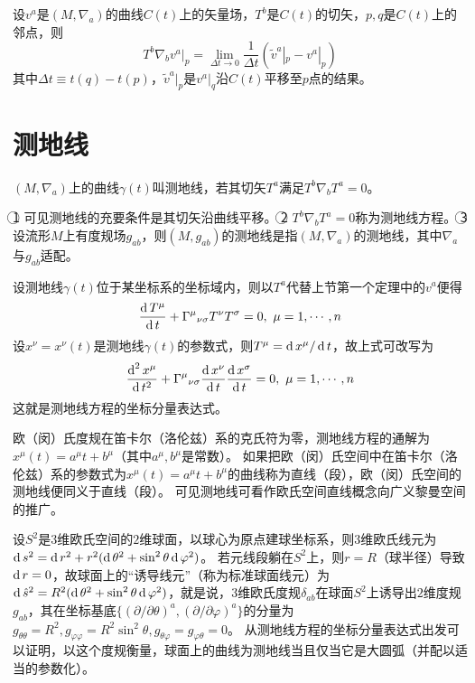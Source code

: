 \begin{theorem}
设$v^a$是$(M, \nabla_a)$的曲线$C(t)$上的矢量场，$T^b$是$C(t)$的切矢，$p, q$是$C(t)$上的邻点，则
$$T^b\nabla_bv^a|_p = \lim_{\Delta t \to 0}\frac{1}{\Delta t}(\tilde v^a|_p - v^a|_p)$$
其中$\Delta t \equiv t(q) - t(p)$，$\tilde v^a|_p$是$v^a|_q$沿$C(t)$平移至$p$点的结果。
\end{theorem}

\section{测地线}

\begin{definition}
$(M, \nabla_a)$上的曲线$\gamma(t)$叫测地线，若其切矢$T^a$满足$T^b\nabla_bT^a = 0$。
\end{definition}

\begin{note}
\textcircled{1} 可见测地线的充要条件是其切矢沿曲线平移。
\textcircled{2} $T^b\nabla_bT^a = 0$称为测地线方程。
\textcircled{3} 设流形$M$上有度规场$g_{ab}$，则$(M, g_{ab})$的测地线是指$(M, \nabla_a)$的测地线，其中$\nabla_a$与$g_{ab}$适配。
\end{note}

设测地线$\gamma(t)$位于某坐标系的坐标域内，则以$T^a$代替上节第一个定理中的$v^a$便得
$$\frac{\operatorname{d} T^\mu}{\operatorname{d} t} + \Gamma^\mu{}_{\nu\sigma}T^\nu T^\sigma = 0, ~ \mu = 1, \cdots, n$$
设$x^\nu = x^\nu(t)$是测地线$\gamma(t)$的参数式，则$T^\mu = \operatorname{d} x^\mu / \operatorname{d} t$，故上式可改写为
$$\frac{\operatorname{d}^2x^\mu}{\operatorname{d} t^2} + \Gamma^\mu{}_{\nu\sigma}\frac{\operatorname{d} x^\nu}{\operatorname{d} t}\frac{\operatorname{d} x^\sigma}{\operatorname{d} t} = 0, ~ \mu = 1, \cdots, n$$
这就是测地线方程的坐标分量表达式。

\begin{example}
欧（闵）氏度规在笛卡尔（洛伦兹）系的克氏符为零，测地线方程的通解为$x^\mu(t) = a^\mu t + b^\mu$（其中$a^\mu, b^\mu$是常数）。
如果把欧（闵）氏空间中在笛卡尔（洛伦兹）系的参数式为$x^\mu(t) = a^\mu t + b^\mu$的曲线称为直线（段），欧（闵）氏空间的测地线便同义于直线（段）。
可见测地线可看作欧氏空间直线概念向广义黎曼空间的推广。
\end{example}

\begin{example}
设$S^2$是$3$维欧氏空间的$2$维球面，以球心为原点建球坐标系，则$3$维欧氏线元为$\operatorname{d} s^2 = \operatorname{d} r^2 + r^2(\operatorname{d} \theta^2 + \sin^2\theta\operatorname{d}\varphi^2)$。
若元线段躺在$S^2$上，则$r = R$（球半径）导致$\operatorname{d} r = 0$，故球面上的``诱导线元''（称为标准球面线元）为$\operatorname{d}\hat{s}^2 = R^2(\operatorname{d} \theta^2 + \sin^2\theta\operatorname{d}\varphi^2)$，就是说，$3$维欧氏度规$\delta_{ab}$在球面$S^2$上诱导出$2$维度规$g_{ab}$，其在坐标基底$\{(\partial / \partial\theta)^a, (\partial / \partial\varphi)^a\}$的分量为$g_{\theta\theta} = R^2, g_{\varphi\varphi} = R^2\sin^2\theta, g_{\theta\varphi} = g_{\varphi\theta} = 0$。
从测地线方程的坐标分量表达式出发可以证明，以这个度规衡量，球面上的曲线为测地线当且仅当它是大圆弧（并配以适当的参数化）。
\end{example}

